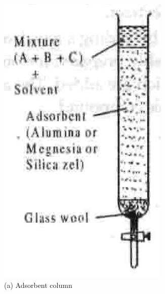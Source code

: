 \documentclass[10pt]{article}
\begin{document}
\includegraphics[max width=\textwidth, center]{2025_01_28_8470952b98110cec3aabg-105(1)}\\
(a) Adsorbent column\\
\end{document}
